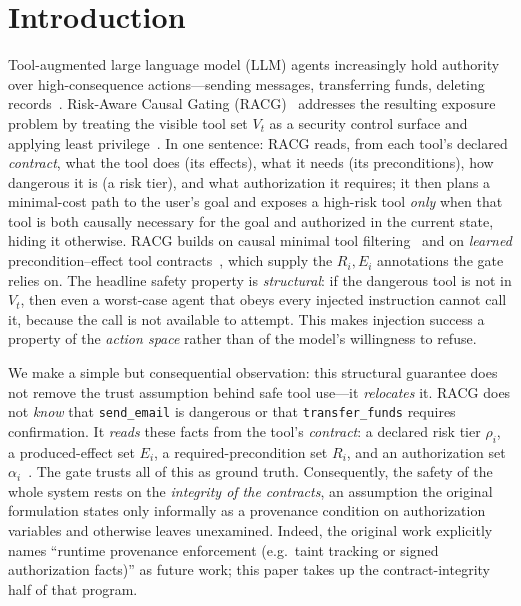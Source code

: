 \documentclass[conference,onecolumn]{IEEEtran}
\theoremstyle{definition}
\newcommand{\racg}{\textsc{RACG}}
\newcommand{\Vt}{V_t}
\newcommand{\code}[1]{\texttt{#1}}
\begin{document}
\section{Introduction}
Tool-augmented large language model (LLM) agents increasingly hold authority
over high-consequence actions---sending messages, transferring funds, deleting
records~\cite{yao2022react,schick2023toolformer,qin2023toollm}. Risk-Aware
Causal Gating (\racg)~\cite{iyer2026racg} addresses the resulting exposure
problem by treating the visible tool set $\Vt$ as a security control surface and
applying least privilege~\cite{saltzer1975protection}. In one sentence: \racg{}
reads, from each tool's declared \emph{contract}, what the tool does (its
effects), what it needs (its preconditions), how dangerous it is (a risk tier),
and what authorization it requires; it then plans a minimal-cost path to the
user's goal and exposes a high-risk tool \emph{only} when that tool is both
causally necessary for the goal and authorized in the current state, hiding it
otherwise. \racg{} builds on causal minimal tool
filtering~\cite{anon2026cmtf} and on \emph{learned} precondition--effect tool
contracts~\cite{iyer2026contract2tool}, which supply the $R_i,E_i$ annotations
the gate relies on. The headline safety property is \emph{structural}: if the
dangerous tool is not in $\Vt$, then even a worst-case agent that obeys every
injected instruction cannot call it, because the call is not available to
attempt. This makes injection success a property of the \emph{action space}
rather than of the model's willingness to refuse.

We make a simple but consequential observation: this structural guarantee does
not remove the trust assumption behind safe tool use---it \emph{relocates} it.
\racg{} does not \emph{know} that \code{send\_email} is dangerous or that
\code{transfer\_funds} requires confirmation. It \emph{reads} these facts from
the tool's \emph{contract}: a declared risk tier $\rho_i$, a produced-effect set
$E_i$, a required-precondition set $R_i$, and an authorization set
$\alpha_i$~\cite{iyer2026racg}. The gate trusts all of this as ground truth.
Consequently, the safety of the whole system rests on the \emph{integrity of the
contracts}, an assumption the original formulation states only informally as a
provenance condition on authorization variables and otherwise leaves
unexamined. Indeed, the original work explicitly names ``runtime provenance
enforcement (e.g.\ taint tracking or signed authorization facts)'' as future
work; this paper takes up the contract-integrity half of that program.
\end{document}
